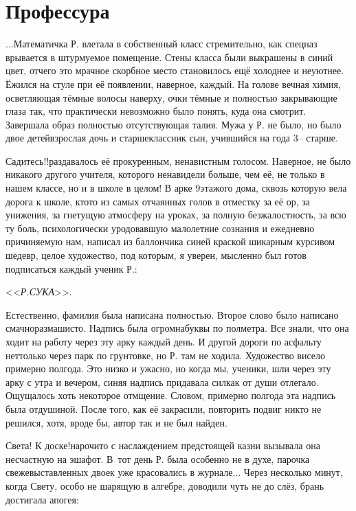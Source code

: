 \newpage
\section*{Профессура}

$\ldots$Математичка Р. влетала в собственный класс стремительно, как спецназ врывается в штурмуемое помещение. Стены класса были выкрашены в синий цвет, отчего это мрачное скорбное место становилось ещё холоднее и неуютнее. Ёжился на стуле при её появлении, наверное, каждый. На голове вечная химия, осветляющая тёмные волосы наверху, очки тёмные и полностью закрывающие глаза так, что практически невозможно было понять, куда она смотрит. Завершала образ полностью отсутствующая талия. Мужа у Р. не было, но было двое детей\mdash взрослая дочь и старшеклассник сын, учившийся на года 3\thinspace\nobreakdash-- старше.

\diagdash Садитесь!!\mdash раздавалось её прокуренным, ненавистным голосом. Наверное, не было никакого другого учителя, которого ненавидели больше, чем её, не только в нашем классе, но и в школе в целом! В арке 9\sdash этажого дома, сквозь которую вела дорога к школе, кто\sdash то из самых отчаянных голов в отместку за её ор, за унижения, за гнетущую атмосферу на уроках, за полную безжалостность, за всю ту боль, психологически уродовавшую малолетние сознания и ежедневно причиняемую нам, написал из баллончика синей краской шикарным курсивом шедевр, целое художество, под которым, я уверен, мысленно был готов подписаться каждый ученик Р.:

<<\textit{Р.\mdash СУКА}>>. 

Естественно, фамилия была написана полностью. Второе слово было написано смачно\sdash размашисто. Надпись была огромна\mdash буквы по полметра. Все знали, что она ходит на работу через эту арку каждый день. И другой дороги по асфальту нет\mdash только через парк по грунтовке, но Р. там не ходила. Художество висело примерно полгода. Это низко и ужасно, но когда мы, ученики, шли через эту арку с утра и вечером, синяя надпись придавала сил\mdash как от души отлегало. Ощущалось хоть некоторое отмщение. Словом, примерно полгода эта надпись была отдушиной. После того, как её закрасили, повторить подвиг никто не решился, хотя, вроде бы, автор так и не был найден.

\diagdash Света! К доске!\mdash нарочито с наслаждением предстоящей казни вызывала она несчастную на эшафот. В~тот день Р. была особенно не в духе, парочка свежевыставленных двоек уже красовались в журнале$\ldots$ Через несколько минут, когда Свету, особо не шарящую в алгебре, доводили чуть не до слёз, брань достигала апогея:

